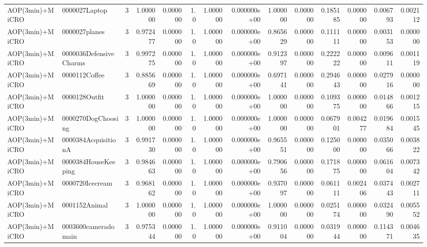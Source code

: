 \begin{tabular}{llrr|r|rr|rr|rr|rrr}
          AOP(3min)+MiCRO &          0000027Laptop &       3 & 1.000000 & 0.000000 &  1.0 &      1.000000 & 0.000000e+00 &      1.000000 & 0.000000 &      0.185185 &    0.000000 &     0.006793 &    0.002112 \\
          AOP(3min)+MiCRO &          0000027planes &       3 & 0.972477 & 0.000000 &  1.0 &      1.000000 & 0.000000e+00 &      0.865629 & 0.000000 &      0.111111 &    0.000000 &     0.003153 &    0.000000 \\
          AOP(3min)+MiCRO & 0000036DefensiveCharms &       3 & 0.997275 & 0.000000 &  1.0 &      1.000000 & 0.000000e+00 &      0.912397 & 0.000000 &      0.222222 &    0.000000 &     0.009611 &    0.001119 \\
          AOP(3min)+MiCRO &          0000112Coffee &       3 & 0.885669 & 0.000000 &  1.0 &      1.000000 & 0.000000e+00 &      0.697141 & 0.000000 &      0.294643 &    0.000000 &     0.027916 &    0.000000 \\
          AOP(3min)+MiCRO &          0000128Outfit &       3 & 1.000000 & 0.000000 &  1.0 &      1.000000 & 0.000000e+00 &      1.000000 & 0.000000 &      0.109375 &    0.000000 &     0.014866 &    0.001215 \\
          AOP(3min)+MiCRO &     0000270DogChoosing &       3 & 1.000000 & 0.000000 &  1.0 &      1.000000 & 0.000000e+00 &      1.000000 & 0.000000 &      0.067901 &    0.004277 &     0.019684 &    0.001545 \\
          AOP(3min)+MiCRO &    0000384AcquisitionA &       3 & 0.991730 & 0.000000 &  1.0 &      1.000000 & 0.000000e+00 &      0.965551 & 0.000000 &      0.125000 &    0.000000 &     0.035066 &    0.003822 \\
          AOP(3min)+MiCRO &    0000384HouseKeeping &       3 & 0.984663 & 0.000000 &  1.0 &      1.000000 & 0.000000e+00 &      0.790656 & 0.000000 &      0.171875 &    0.000000 &     0.061604 &    0.007342 \\
          AOP(3min)+MiCRO &        0000720Icecream &       3 & 0.968162 & 0.000000 &  1.0 &      1.000000 & 0.000000e+00 &      0.937097 & 0.000000 &      0.061111 &    0.002406 &     0.037443 &    0.002711 \\
          AOP(3min)+MiCRO &          0001152Animal &       3 & 1.000000 & 0.000000 &  1.0 &      1.000000 & 0.000000e+00 &      1.000000 & 0.000000 &      0.025174 &    0.000000 &     0.032490 &    0.005552 \\
          AOP(3min)+MiCRO &    0003600cameradomain &       3 & 0.975344 & 0.000000 &  1.0 &      1.000000 & 0.000000e+00 &      0.911004 & 0.000000 &      0.031944 &    0.000000 &     0.114371 &    0.004635 \\

\end{tabular}
